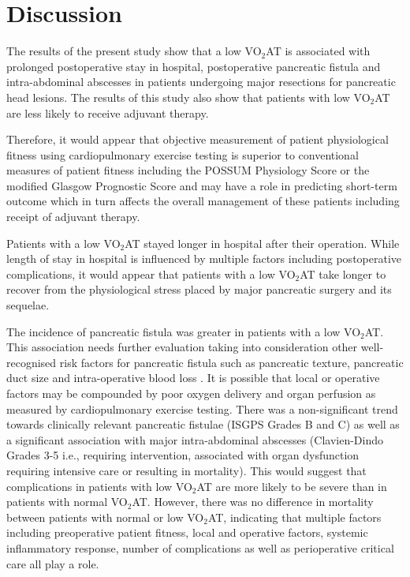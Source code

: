 \clearpage

\section{Discussion}
The results of the present study show that a low VO$_2$AT is associated with prolonged postoperative stay in hospital, postoperative pancreatic fistula and intra-abdominal abscesses in patients undergoing major resections for pancreatic head lesions. 
The results of this study also show that patients with low VO$_2$AT are less likely to receive adjuvant therapy. 

Therefore, it would appear that objective measurement of patient physiological fitness using cardiopulmonary exercise testing is superior to conventional measures of patient fitness including the POSSUM Physiology Score or the modified Glasgow Prognostic Score and may have a role in predicting short-term outcome which in turn affects the overall management of these patients including receipt of adjuvant therapy.

Patients with a low VO$_2$AT stayed longer in hospital after their operation. 
While length of stay in hospital is influenced by multiple factors including postoperative complications, it would appear that patients with a low VO$_2$AT take longer to recover from the physiological stress placed by major pancreatic surgery and its sequelae.

The incidence of pancreatic fistula was greater in patients with a low VO$_2$AT. 
This association needs further evaluation taking into consideration other well-recognised risk factors for pancreatic fistula such as pancreatic texture, pancreatic duct size and intra-operative blood loss \parencite{braga_prognostic_2011, pratt_possum_2008, winter_1423_2006}. 
It is possible that local or operative factors may be compounded by poor oxygen delivery and organ perfusion as measured by cardiopulmonary exercise testing. 
There was a non-significant trend towards clinically relevant pancreatic fistulae (ISGPS Grades B and C) as well as a significant association with major intra-abdominal abscesses (Clavien-Dindo Grades 3-5 i.e., requiring intervention, associated with organ dysfunction requiring intensive care or resulting in mortality). 
This would suggest that complications in patients with low VO$_2$AT are more likely to be severe than in patients with normal VO$_2$AT. 
However, there was no difference in mortality between patients with normal or low VO$_2$AT, indicating that multiple factors including preoperative patient fitness, local and operative factors, systemic inflammatory response, number of complications as well as perioperative critical care all play a role.

